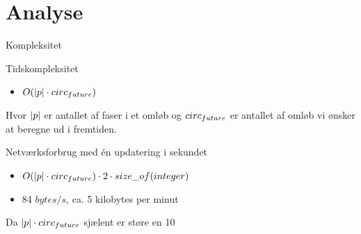 \section{Analyse}
\begin{frame}{Kompleksitet}

Tidskompleksitet
\begin{itemize}
\item $O(|p|\cdot circ_{future})$
\end{itemize}
Hvor $|p|$ er antallet af faser i et omløb og $circ_{future}$ er antallet af omløb vi ønsker at beregne ud i fremtiden.

\vspace{0.5cm}
Netværksforbrug med én updatering i sekundet
\begin{itemize}
\item $O(|p|\cdot circ_{future})\cdot 2\cdot size\_of(integer)$
\item 84 $bytes/s$, ca. 5 kilobytes per minut
\end{itemize}
Da $|p|\cdot circ_{future}$ sjælent er støre en 10
\end{frame}